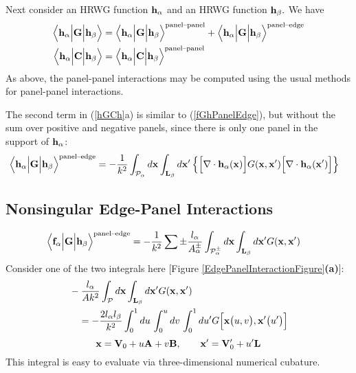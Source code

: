 \documentclass[letterpaper]{article}
\begin{document}
Next consider an HRWG function $\mathbf{h}_\alpha$ and an HRWG function
$\mathbf{h}_\beta.$ We have 
\begin{subequations}
\begin{align}
  \Big\langle \mathbf{h}_\alpha \Big| \mathbf{G} \Big| \mathbf{h}_\beta \Big\rangle
&=
  \Big\langle \mathbf{h}_\alpha \Big| \mathbf{G} \Big| \mathbf{h}_\beta \Big\rangle^{\hbox{\scriptsize{panel--panel}}}
+
  \Big\langle \mathbf{h}_\alpha \Big| \mathbf{G} \Big| \mathbf{h}_\beta \Big\rangle^{\hbox{\scriptsize{panel--edge}}}
\\
  \Big\langle \mathbf{h}_\alpha \Big| \mathbf{C} \Big| \mathbf{h}_\beta \Big\rangle
&=
  \Big\langle \mathbf{h}_\alpha \Big| \mathbf{C} \Big| \mathbf{h}_\beta \Big\rangle^{\hbox{\scriptsize{panel--panel}}}
\end{align}
\label{hGCh}
\end{subequations}
As above, the panel-panel interactions may be computed using 
the usual \lss methods for panel-panel interactions.

The second term in (\ref{hGCh}a) is similar to (\ref{fGhPanelEdge}),
but without the sum over positive and negative panels, since
there is only one panel in the support of $\mathbf{h}_\alpha$:
\begin{align*}
\Big\langle \mathbf{h}_\alpha \Big| \mathbf{G} \Big| \mathbf{h}_\beta \Big\rangle^{\hbox{\scriptsize{panel--edge}}}
= -&\frac{1}{k^2}
   \int_{\mathcal{P}_\alpha} d\mathbf{x}
   \int_{\mathbf{L}_\beta} d\mathbf{x}^\prime
   \left\{ \Big[\nabla \cdot \mathbf{h}_\alpha(\mathbf{x})\Big]
           G(\mathbf{x}, \mathbf{x}^\prime)
           \Big[\nabla \cdot \mathbf{h}_\alpha(\mathbf{x}^\prime)\Big]
   \right\}
\end{align*}

\subsection*{Nonsingular Edge-Panel Interactions}

\begin{align*}
\Big\langle \mathbf{f}_\alpha \Big| \mathbf{G} \Big| \mathbf{h}_\beta \Big\rangle^{\hbox{\scriptsize{panel--edge}}}
&=-\frac{1}{k^2}\sum\pm \frac{l_\alpha}{A_\alpha^\pm}
   \int_{\mathcal{P}_\alpha^\pm} d\mathbf{x} \int_{\mathbf{L}_\beta} d\mathbf{x}^\prime
   G(\mathbf{x}, \mathbf{x}^\prime)
\end{align*}
Consider one of the two integrals here 
[Figure \ref{EdgePanelInteractionFigure}\textbf{(a)}]:
\begin{align}
&
 -\frac{l_\alpha}{Ak^2 }
   \int_{\mathcal{P}} d\mathbf{x} \int_{\mathbf{L}_\beta} d\mathbf{x}^\prime
   G(\mathbf{x}, \mathbf{x}^\prime)
\nonumber \\
&\quad=
 -\frac{2l_\alpha l_\beta}{k^2 }
  \int_0^1 du \, \int_0^u dv \, \int_0^1 du^\prime
   G\Big[\mathbf{x}\big(u,v\big), \mathbf{x}^\prime\big(u^\prime\big)\Big]
\label{EdgePanelCubature}
\end{align}
$$ \mathbf{x} = \mathbf{V}_0 + u\mathbf{A} + v\mathbf{B}, \qquad 
   \mathbf{x}^\prime = \mathbf{V}_0^\prime + u^\prime\mathbf{L}
$$
This integral is easy to evaluate via three-dimensional
numerical cubature.
\end{document}
